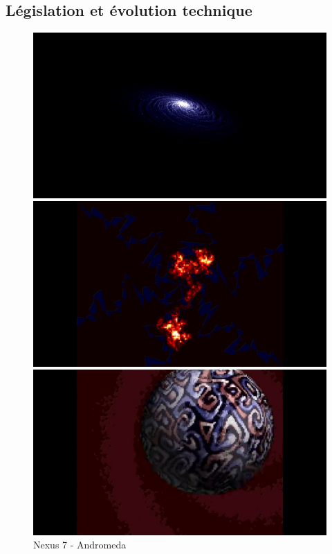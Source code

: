 \subsection*{Législation et évolution technique}

\begin{figure}[h]
  \begin{minipage}[b]{0.30\linewidth}
    \centering
    \includegraphics[width=\linewidth]{images/demoscene/demos/andromeda1.png}
  \end{minipage}
  \hfill
  \begin{minipage}[b]{0.30\linewidth}
    \centering
    \includegraphics[width=\linewidth]{images/demoscene/demos/andromeda2.png}
  \end{minipage}
  \hfill
  \begin{minipage}[b]{0.30\linewidth}
    \centering
    \includegraphics[width=\linewidth]{images/demoscene/demos/andromeda3.png}
  \end{minipage}
  \caption{Nexus 7 - Andromeda}
  \label{andromeda}
\end{figure}


